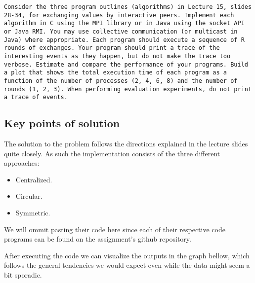 \documentclass[a4paper,11pt]{article}
\begin{document}
\begin{verbatim}
Consider the three program outlines (algorithms) in Lecture 15, slides 28-34, for exchanging values by interactive peers. Implement each algorithm in C using the MPI library or in Java using the socket API or Java RMI. You may use collective communication (or multicast in Java) where appropriate. Each program should execute a sequence of R rounds of exchanges. Your program should print a trace of the interesting events as they happen, but do not make the trace too verbose. Estimate and compare the performance of your programs. Build a plot that shows the total execution time of each program as a function of the number of processes (2, 4, 6, 8) and the number of rounds (1, 2, 3). When performing evaluation experiments, do not print a trace of events.
\end{verbatim}


\subsection*{Key points of solution}

The solution to the problem follows the directions explained in the lecture slides quite closely. As such the implementation consists of the three different approaches:
\begin{itemize}[noitemsep]
        \item Centralized.
        \item Circular.
        \item Symmetric.
    \end{itemize}

We will ommit pasting their code here since each of their respective code programs can be found on the assignment's github repository.

After executing the code we can visualize the outputs in the graph bellow, which follows the general tendencies we would expect even while the data might seem a bit sporadic.
\end{document}
